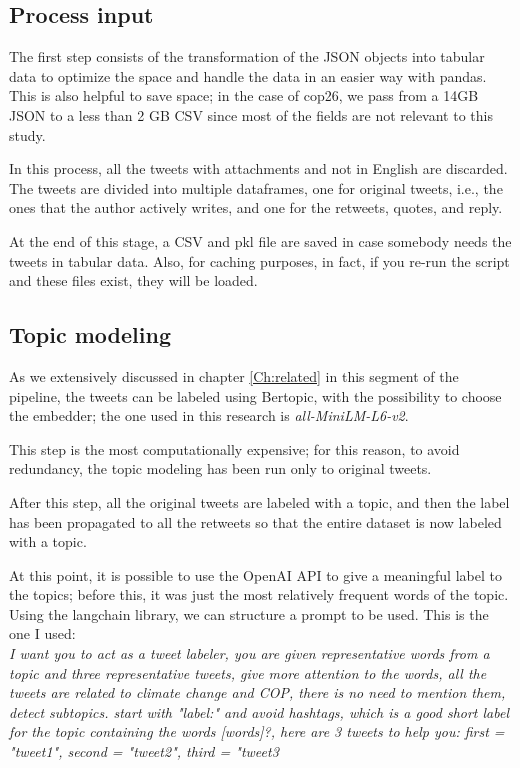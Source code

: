 \subsection{Process input}

The first step consists of the transformation of the JSON objects into tabular data to optimize the space and handle the data in an easier way with pandas. This is also helpful to save space; in the case of cop26, we pass from a 14GB JSON to a less than 2 GB CSV since most of the fields are not relevant to this study.

In this process, all the tweets with attachments and not in English are discarded. The tweets are divided into multiple dataframes, one for original tweets, i.e., the ones that the author actively writes, and one for the retweets, quotes, and reply.

At the end of this stage, a CSV and pkl file are saved in case somebody needs the tweets in tabular data. Also, for caching purposes, in fact, if you re-run the script and these files exist, they will be loaded.

\subsection{Topic modeling}

As we extensively discussed in chapter \ref{Ch:related} in this segment of the pipeline, the tweets can be labeled using Bertopic, with the possibility to choose the embedder; the one used in this research is \textit{all-MiniLM-L6-v2}.

This step is the most computationally expensive; for this reason, to avoid redundancy, the topic modeling has been run only to original tweets. 

After this step, all the original tweets are labeled with a topic, and then the label has been propagated to all the retweets so that the entire dataset is now labeled with a topic.

At this point, it is possible to use the OpenAI API to give a meaningful label to the topics; before this, it was just the most relatively frequent words of the topic. Using the langchain library, we can structure a prompt to be used. This is the one I used: 
\\

\textit{    I want you to act as a tweet labeler, you are given representative words
from a topic and three representative tweets, give more attention to the words, all the tweets are related to climate change and COP, there is no need to mention them, detect subtopics.
start with "label:" and avoid hashtags,
which is a good short label for the topic containing the words [{words}]?, here are 3 tweets to help you:
first = "{tweet1}", second = "{tweet2}", third = "{tweet3}}
\\


